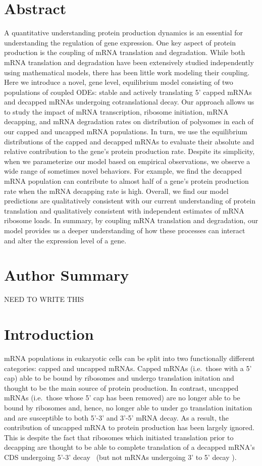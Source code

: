 \documentclass[10pt,letterpaper]{article}
\begin{document}
\section*{Abstract}
A quantitative understanding protein production dynamics is an essential for understanding the regulation of gene expression.
One key aspect of protein production is the coupling of mRNA translation and degradation.
While both mRNA translation and degradation have been extensively studied independently using mathematical models, there has been little work modeling their coupling.
Here we introduce a novel, gene level, equilibrium model consisting of two populations of coupled ODEs: stable and actively translating 5' capped mRNAs and decapped mRNAs undergoing cotranslational decay.
Our approach allows us to study the impact of mRNA transcription, ribosome initiation, mRNA decapping, and mRNA degradation rates on distribution of polysomes in each of our capped and uncapped mRNA populations.
In turn, we use the equilibrium distributions of the capped and decapped mRNAs to evaluate their absolute and relative contribution to the gene's protein production rate.
Despite its simplicity, when we parameterize our model based on empirical observations, we observe a wide range of sometimes novel behaviors.
For example, we find the decapped mRNA population can contribute to almost half of a gene's protein production rate when the mRNA decapping rate is high.
Overall, we find our model predictions are qualitatively consistent with our current understanding of protein translation and qualitatively consistent with independent estimates of mRNA ribosome loads.
In summary, by coupling mRNA translation and degradation, our model provides us a deeper understanding of how these processes can interact and alter the expression level of a gene.


\section*{Author Summary}

NEED TO WRITE THIS



\linenumbers

\section*{Introduction}

mRNA populations in eukaryotic cells can be split into two functionally different categories: capped and uncapped mRNAs.
Capped mRNAs (i.e.~those with a 5' cap) able to be bound by ribosomes and undergo translation initation and thought to be the main source of protein production.
In contrast, uncapped mRNAs (i.e.~those whose 5' cap has been removed) are no longer able to be bound by ribosomes and, hence, no longer able to under go translation initation and are susceptible to both 5'-3' and 3'-5' mRNA decay.
As a result, the contribution of uncapped mRNA to protein production has been largely ignored.
This is despite the fact that ribosomes which initiated translation prior to decapping are thought to be able to complete translation of a decapped mRNA's CDS undergoing 5'-3' decay~\cite{RN3,RN4} (but not mRNAs undergoing 3' to 5' decay \cite{RN5}).
\end{document}
